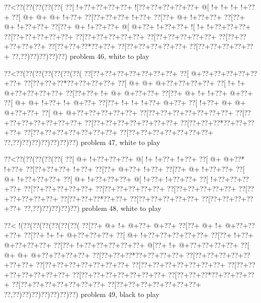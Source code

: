 \vbox{\vbox{\goo
\0??<\0??(\0??(\0??(\0??(\0??(
\0??[\- !+\0??+\0??+\0??+\0??+
\- ![\0??+\0??+\0??+\0??+\0??+
\- @[\- !+\- !+\- !+\- !+\0??+
\0??[\- @+\- @+\- @+\- !+\0??+
\0??[\0??+\0??+\0??+\- !+\0??+
\0??[\0??+\- @+\- !+\0??+\0??+
\0??[\0??+\- @+\- !+\0??+\0??+
\0??[\0??+\- @+\- !+\0??+\0??+
\- @[\- @+\0??+\- !+\0??+\0??+
\- ![\- !+\- !+\0??+\0??+\0??+
\0??[\0??+\0??+\0??+\0??+\0??+
\0??[\0??+\0??+\0??+\0??+\0??+
\0??[\0??+\0??+\0??+\0??+\0??+
\0??[\0??+\0??+\0??+\0??+\0??+
\0??[\0??+\0??+\0??*\0??+\0??+
\0??[\0??+\0??+\0??+\0??+\0??+
\0??[\0??+\0??+\0??+\0??+\0??+
\0??,\0??)\0??)\0??)\0??)\0??)
}
\hfil problem 46, white to play\hfil\break
}

\vbox{\vbox{\goo
\0??<\0??(\0??(\0??(\0??(\0??(\0??(\0??(
\0??[\0??+\0??+\0??+\0??+\0??+\0??+\0??+
\0??[\- @+\0??+\0??+\0??+\0??+\0??+\0??+
\0??[\0??+\0??+\0??*\0??+\0??+\0??+\0??+
\0??[\- @+\- @+\- @+\0??+\0??+\0??+\0??+
\0??[\- !+\- !+\- @+\0??+\0??+\0??+\0??+
\0??[\0??+\0??+\- !+\- @+\- @+\0??+\0??+
\0??[\0??+\- @+\- !+\- !+\0??+\- @+\0??+
\0??[\- @+\- @+\- !+\0??+\- !+\- @+\0??+
\0??[\0??+\- !+\- !+\- !+\0??+\- @+\0??+
\0??[\- !+\0??+\- @+\- @+\- @+\0??+\0??+
\0??[\- @+\- @+\0??+\0??+\0??+\0??+\0??+
\0??[\0??+\0??+\0??+\0??+\0??+\0??+\0??+
\0??[\0??+\0??+\0??+\0??+\0??+\0??+\0??+
\0??[\0??+\0??+\0??+\0??+\0??+\0??+\0??+
\0??[\0??+\0??+\0??*\0??+\0??+\0??+\0??+
\0??[\0??+\0??+\0??+\0??+\0??+\0??+\0??+
\0??[\0??+\0??+\0??+\0??+\0??+\0??+\0??+
\0??,\0??)\0??)\0??)\0??)\0??)\0??)\0??)
}
\hfil problem 47, white to play\hfil\break
}

\vbox{\vbox{\goo
\0??<\0??(\0??(\0??(\0??(\0??(
\0??[\- @+\- !+\0??+\0??+\0??+
\- @[\- !+\- !+\0??+\- !+\0??+
\0??[\- @+\- @+\0??*\- !+\0??+
\0??[\0??+\0??+\0??+\- !+\0??+
\0??[\0??+\- @+\0??+\- !+\0??+
\0??[\0??+\- @+\- !+\0??+\0??+
\0??[\- @+\- !+\0??+\0??+\0??+
\0??[\- @+\- !+\0??+\0??+\0??+
\- @[\- !+\0??+\- !+\0??+\0??+
\0??[\- !+\0??+\0??+\0??+\0??+
\0??[\0??+\0??+\0??+\0??+\0??+
\0??[\0??+\0??+\0??+\0??+\0??+
\0??[\0??+\0??+\0??+\0??+\0??+
\0??[\0??+\0??+\0??+\0??+\0??+
\0??[\0??+\0??+\0??*\0??+\0??+
\0??[\0??+\0??+\0??+\0??+\0??+
\0??[\0??+\0??+\0??+\0??+\0??+
\0??,\0??)\0??)\0??)\0??)\0??)
}
\hfil problem 48, white to play\hfil\break
}

\vbox{\vbox{\goo
\0??<\- !(\0??(\0??(\0??(\0??(\0??(\0??(
\0??[\0??+\- @+\- !+\- @+\0??+\- @+\0??+
\0??[\0??+\- @+\- !+\- @+\0??+\0??+\0??+
\0??[\0??+\- !+\- !+\- @+\0??+\0??+\0??+
\0??[\- @+\- !+\0??+\0??+\0??+\0??+\0??+
\0??[\0??+\- !+\0??+\- @+\0??+\0??+\0??+
\0??[\0??+\- !+\0??+\0??+\0??+\0??+\0??+
\- @[\0??+\- !+\- @+\0??+\0??+\0??+\0??+
\0??[\- @+\- @+\- @+\0??+\0??+\0??+\0??+
\0??[\0??+\0??+\0??*\0??+\0??+\0??+\0??+
\0??[\0??+\0??+\0??+\0??+\0??+\0??+\0??+
\0??[\0??+\0??+\0??+\0??+\0??+\0??+\0??+
\0??[\0??+\0??+\0??+\0??+\0??+\0??+\0??+
\0??[\0??+\0??+\0??+\0??+\0??+\0??+\0??+
\0??[\0??+\0??+\0??+\0??+\0??+\0??+\0??+
\0??[\0??+\0??+\0??*\0??+\0??+\0??+\0??+
\0??[\0??+\0??+\0??+\0??+\0??+\0??+\0??+
\0??[\0??+\0??+\0??+\0??+\0??+\0??+\0??+
\0??,\0??)\0??)\0??)\0??)\0??)\0??)\0??)
}
\hfil problem 49, black to play\hfil\break
}

